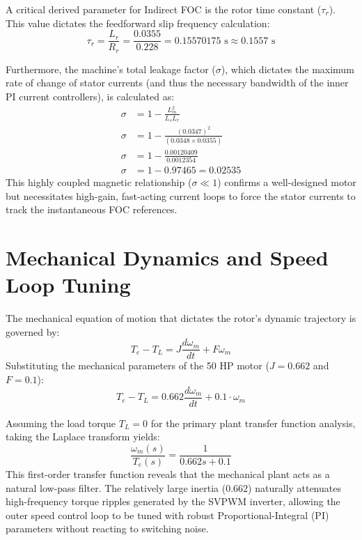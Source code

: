 \documentclass[12pt,a4paper]{report}
\begin{document}
A critical derived parameter for Indirect FOC is the rotor time constant ($\tau_r$). This value dictates the feedforward slip frequency calculation:
\begin{equation}
\tau_{r} = \frac{L_{r}}{R_{r}} = \frac{0.0355}{0.228} = 0.15570175 \text{ s} \approx 0.1557 \text{ s}
\end{equation}

Furthermore, the machine's total leakage factor ($\sigma$), which dictates the maximum rate of change of stator currents (and thus the necessary bandwidth of the inner PI current controllers), is calculated as:
\begin{align}
\sigma &= 1 - \frac{L_{m}^2}{L_{s}L_{r}} \\
\sigma &= 1 - \frac{(0.0347)^2}{(0.0348 \times 0.0355)} \\
\sigma &= 1 - \frac{0.00120409}{0.0012354} \\
\sigma &= 1 - 0.97465 = 0.02535
\end{align}
This highly coupled magnetic relationship ($\sigma \ll 1$) confirms a well-designed motor but necessitates high-gain, fast-acting current loops to force the stator currents to track the instantaneous FOC references.

\section{Mechanical Dynamics and Speed Loop Tuning}
The mechanical equation of motion that dictates the rotor's dynamic trajectory is governed by:
\begin{equation}
T_{e} - T_{L} = J\frac{d\omega_{m}}{dt} + F\omega_{m}
\end{equation}
Substituting the mechanical parameters of the 50 HP motor ($J=0.662$ and $F=0.1$):
\begin{equation}
T_{e} - T_{L} = 0.662\frac{d\omega_{m}}{dt} + 0.1\cdot\omega_{m}
\end{equation}

Assuming the load torque $T_L = 0$ for the primary plant transfer function analysis, taking the Laplace transform yields:
\begin{equation}
\frac{\omega_{m}(s)}{T_{e}(s)} = \frac{1}{0.662s + 0.1}
\end{equation}
This first-order transfer function reveals that the mechanical plant acts as a natural low-pass filter. The relatively large inertia ($0.662$) naturally attenuates high-frequency torque ripples generated by the SVPWM inverter, allowing the outer speed control loop to be tuned with robust Proportional-Integral (PI) parameters without reacting to switching noise.
\end{document}
